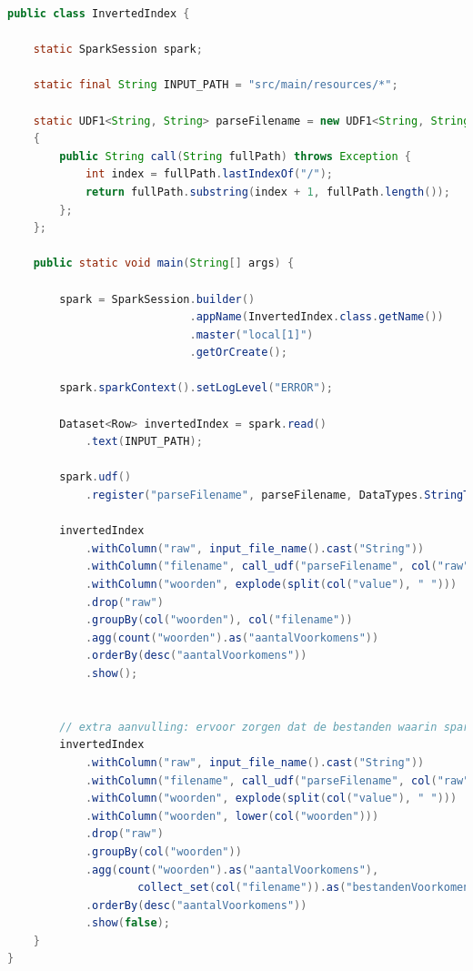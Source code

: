 \documentclass[a4paper,10pt,twoside]{report}
\begin{document}
\begin{lstlisting}[language=Java]
public class InvertedIndex {
	
	static SparkSession spark;
	
	static final String INPUT_PATH = "src/main/resources/*";
	
	static UDF1<String, String> parseFilename = new UDF1<String, String>()
	{
		public String call(String fullPath) throws Exception {
			int index = fullPath.lastIndexOf("/");
			return fullPath.substring(index + 1, fullPath.length());
		};
	};
	
	public static void main(String[] args) {
		
		spark = SparkSession.builder()
							.appName(InvertedIndex.class.getName())
							.master("local[1]")
							.getOrCreate();
							
		spark.sparkContext().setLogLevel("ERROR");
		
		Dataset<Row> invertedIndex = spark.read()
			.text(INPUT_PATH);
		
		spark.udf()
			.register("parseFilename", parseFilename, DataTypes.StringType);
		
		invertedIndex
			.withColumn("raw", input_file_name().cast("String")) 			
			.withColumn("filename", call_udf("parseFilename", col("raw"))) 	
			.withColumn("woorden", explode(split(col("value"), " ")))		
			.drop("raw")													
			.groupBy(col("woorden"), col("filename"))						
			.agg(count("woorden").as("aantalVoorkomens"))
			.orderBy(desc("aantalVoorkomens"))
			.show();
		
		
		// extra aanvulling: ervoor zorgen dat de bestanden waarin spark terechtkomt opnemen
		invertedIndex
			.withColumn("raw", input_file_name().cast("String")) 			
			.withColumn("filename", call_udf("parseFilename", col("raw"))) 	
			.withColumn("woorden", explode(split(col("value"), " ")))  		
			.withColumn("woorden", lower(col("woorden")))
			.drop("raw")													
			.groupBy(col("woorden"))										
			.agg(count("woorden").as("aantalVoorkomens"), 					
					collect_set(col("filename")).as("bestandenVoorkomens"))	
			.orderBy(desc("aantalVoorkomens"))
			.show(false);	
	}
}
\end{lstlisting}

\newpage
\end{document}
